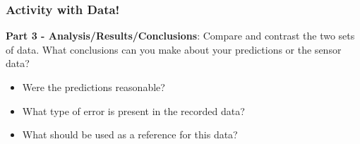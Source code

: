 \documentclass[fleqn]{beamer} %
\newcommand{\sectiontitleIV}{Activity with Data!}
\begin{document}
	\begin{frame}[label=sectionIV]
		\frametitle{\sectiontitleIV}
		\scriptsize
		{\bf Part 3 - Analysis/Results/Conclusions}: Compare and contrast the two sets of data. What conclusions can you make about your predictions or the sensor data?
		\begin{multicols}{2}

			\begin{itemize}
				\item Were the predictions reasonable? \\
				\item What type of error is present in the recorded data? \\
				\item What should be used as a reference for this data? \\ 
			\end{itemize}
			


\end{multicols}
\end{frame}
\end{document}

